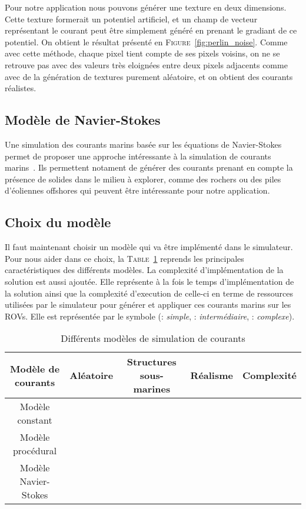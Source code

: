 				Pour notre application nous pouvons générer une texture en deux dimensions. Cette texture formerait un potentiel artificiel, et un champ de vecteur représentant le courant peut être simplement généré en prenant le gradiant de ce potentiel. On obtient le résultat présenté en \textsc{Figure}~\ref{fig:perlin_noise}. Comme avec cette méthode, chaque pixel tient compte de ses pixels voisins, on ne se retrouve pas avec des valeurs très eloignées entre deux pixels adjacents comme avec de la génération de textures purement aléatoire, et on obtient des courants réalistes. 

			\subsection{Modèle de Navier-Stokes}

				Une simulation des courants marins basée sur les équations de Navier-Stokes permet de proposer une approche intéressante à la simulation de courants marins~\cite{Garau2006current}. Ils permettent notament de générer des courants prenant en compte la présence de solides dans le milieu à explorer, comme des rochers ou des piles d'éoliennes offshores qui peuvent être intéressante pour notre application.

			\subsection{Choix du modèle}

				Il faut maintenant choisir un modèle qui va être implémenté dans le simulateur. Pour nous aider dans ce choix, la \textsc{Table}~\ref{table:courants} reprends les principales caractéristiques des différents modèles. La complexité d'implémentation de la solution est aussi ajoutée. Elle représente à la fois le temps d'implémentation de la solution ainsi que la complexité d'execution de celle-ci en terme de ressources utilisées par le simulateur pour générer et appliquer ces courants marins sur les \gls{ROV}s. Elle est représentée par le symbole \pmark (\pmark : \textit{simple}, \pmark \pmark : \textit{intermédiaire}, \pmark \pmark \pmark : \textit{complexe}).

				\begin{table}[ht]
					\centering
					\begin{adjustbox}{max width=\textwidth}
						\begin{tabular}{|c|c|c|c|c|}
							\hline
							\textbf{Modèle de courants} & \textbf{Aléatoire} & \textbf{Structures sous-marines} & \textbf{Réalisme} & \textbf{Complexité} \\
							\hline
							Modèle constant & \xmark & \xmark & \pmark & \pmark\\
							\hline
							Modèle procédural & \cmark & \xmark & \pmark \pmark & \pmark \pmark\\
							\hline
							Modèle Navier-Stokes & \xmark & \cmark & \pmark \pmark \pmark & \pmark \pmark \pmark \\
							\hline
						\end{tabular}
					\end{adjustbox}
					\caption{Différents modèles de simulation de courants}
					\label{table:courants}
				\end{table}

